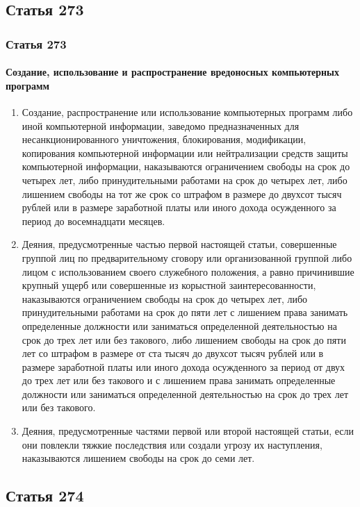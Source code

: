 \subsection{Статья 273}

\begin{frame}[allowframebreaks]
    \frametitle{Статья 273}
    \framesubtitle{Создание, использование и распространение вредоносных компьютерных программ}
    \begin{enumerate}
        \item Создание, распространение или использование компьютерных программ либо иной компьютерной информации, заведомо предназначенных для несанкционированного уничтожения, блокирования, модификации, копирования компьютерной информации или нейтрализации средств защиты компьютерной информации, наказываются ограничением свободы на срок до четырех лет, либо принудительными работами на срок до четырех лет, либо лишением свободы на тот же срок со штрафом в размере до двухсот тысяч рублей или в размере заработной платы или иного дохода осужденного за период до восемнадцати месяцев.
        
        \item Деяния, предусмотренные частью первой настоящей статьи, совершенные группой лиц по предварительному сговору или организованной группой либо лицом с использованием своего служебного положения, а равно причинившие крупный ущерб или совершенные из корыстной заинтересованности, наказываются ограничением свободы на срок до четырех лет, либо принудительными работами на срок до пяти лет с лишением права занимать определенные должности или заниматься определенной деятельностью на срок до трех лет или без такового, либо лишением свободы на срок до пяти лет со штрафом в размере от ста тысяч до двухсот тысяч рублей или в размере заработной платы или иного дохода осужденного за период от двух до трех лет или без такового и с лишением права занимать определенные должности или заниматься определенной деятельностью на срок до трех лет или без такового.
        
        \item Деяния, предусмотренные частями первой или второй настоящей статьи, если они повлекли тяжкие последствия или создали угрозу их наступления, наказываются лишением свободы на срок до семи лет.
    \end{enumerate}
\end{frame}
 
 
\subsection{Статья 274}


